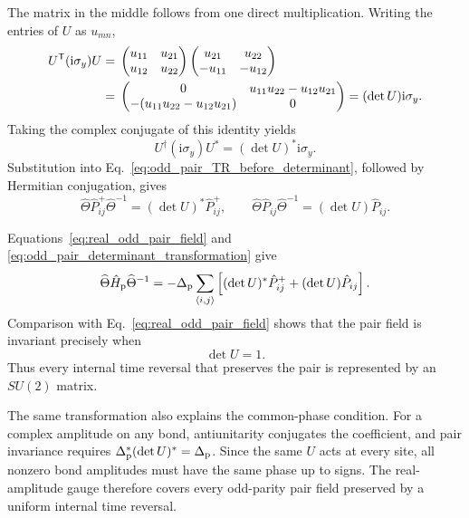\documentclass[onecolumn,aps,prb,amsmath,amssymb,superscriptaddress,longbibliography]{revtex4-2}
\newcommand{\ii}{\mathrm{i}}
\newcommand{\trans}{\mathsf{T}}
\begin{document}
The matrix in the middle follows from one direct multiplication.  Writing the entries of \(U\) as \(u_{mn}\),
\begin{align}
    U^\trans(\ii\sigma_y)U
    &={}
    \begin{pmatrix}u_{11}&u_{21}\\u_{12}&u_{22}\end{pmatrix}
    \begin{pmatrix}u_{21}&u_{22}\\-u_{11}&-u_{12}\end{pmatrix}
    \notag\\
    &={}
    \begin{pmatrix}
        0&u_{11}u_{22}-u_{12}u_{21}\\
        -(u_{11}u_{22}-u_{12}u_{21})&0
    \end{pmatrix}
    =(\det U)\ii\sigma_y.
    \label{eq:two_by_two_determinant_identity}
\end{align}
Taking the complex conjugate of this identity yields
\begin{equation}
    U^\dagger(\ii\sigma_y)U^*
    =(\det U)^*\ii\sigma_y.
    \label{eq:odd_pair_determinant_identity}
\end{equation}
Substitution into Eq.~\eqref{eq:odd_pair_TR_before_determinant}, followed by Hermitian conjugation, gives
\begin{equation}
    \widehat\Theta\hat P_{ij}^+\widehat\Theta^{-1}
    =(\det U)^*\hat P_{ij}^+,
    \qquad
    \widehat\Theta\hat P_{ij}\widehat\Theta^{-1}
    =(\det U)\hat P_{ij}.
    \label{eq:odd_pair_determinant_transformation}
\end{equation}

Equations~\eqref{eq:real_odd_pair_field} and \eqref{eq:odd_pair_determinant_transformation} give
\begin{equation}
    \widehat\Theta\hat H_{\rm p}\widehat\Theta^{-1}
    =-\Delta_{\rm p}\sum_{\langle i,j\rangle}
    \left[(\det U)^*\hat P_{ij}^++(\det U)\hat P_{ij}\right].
\end{equation}
Comparison with Eq.~\eqref{eq:real_odd_pair_field} shows that the pair field is invariant precisely when
\begin{equation}
    \det U=1.
    \label{eq:pair_preserving_determinant}
\end{equation}
Thus every internal time reversal that preserves the pair is represented by an \(SU(2)\) matrix.

The same transformation also explains the common-phase condition.  For a complex amplitude on any bond, antiunitarity conjugates the coefficient, and pair invariance requires \(\Delta_{\rm p}^*(\det U)^*=\Delta_{\rm p}\).  Since the same \(U\) acts at every site, all nonzero bond amplitudes must have the same phase up to signs.  The real-amplitude gauge therefore covers every odd-parity pair field preserved by a uniform internal time reversal.
\end{document}
